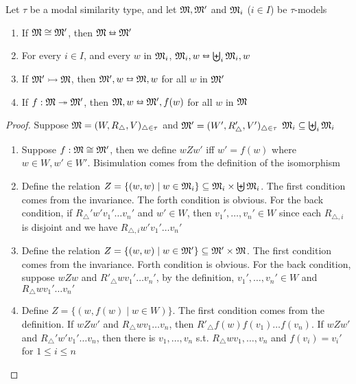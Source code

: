 \documentclass[11pt]{article}
\begin{document}
\begin{proposition}[]
Let \(\tau\) be a modal similarity type, and let \(\mathfrak{M},\mathfrak{M}'\) and \(\mathfrak{M}_i\) (\(i\in
   I\)) be \(\tau\)-models
\begin{enumerate}
\item If \(\mathfrak{M}\cong\mathfrak{M}'\), then \(\mathfrak{M}\leftrightarroweq\mathfrak{M}'\)
\item For every \(i\in I\), and every \(w\) in \(\mathfrak{M}_i\),
\(\mathfrak{M}_i,w\leftrightarroweq\biguplus_i\mathfrak{M}_i,w\)
\item If \(\mathfrak{M}'\rightarrowtail\mathfrak{M}\), then \(\mathfrak{M}',w\leftrightarroweq\mathfrak{M},w\) for
all \(w\) in \(\mathfrak{M}'\)
\item If \(f:\mathfrak{M}\twoheadrightarrow\mathfrak{M}'\), then
\(\mathfrak{M},w\leftrightarroweq\mathfrak{M}',f(w)\) for all \(w\) in \(\mathfrak{M}\)
\end{enumerate}
\end{proposition}

\begin{proof}
Suppose \(\mathfrak{M}=(W,R_{\triangle},V)_{\triangle\in\tau}\) and
\(\mathfrak{M}'=(W',R_{\triangle}',V')_{\triangle\in\tau}\) 
\(\mathfrak{M}_i\subseteq \biguplus_i\mathfrak{M}_i\)
\begin{enumerate}
\item Suppose \(f:\mathfrak{M}\cong\mathfrak{M}'\), then we define \(wZw'\) iff \(w'=f(w)\) where
\(w\in W,w'\in W'\). Bisimulation comes from the definition of the isomorphism
\item Define the relation \(Z=\{(w,w)\mid
      w\in\mathfrak{M}_i\}\subseteq\mathfrak{M}_i\times\biguplus\mathfrak{M}_i\). The first condition comes
from the invariance. The forth condition is obvious. For the back
condition, if \(R_{\triangle}'w'v_1'\dots v_n'\) and \(w'\in W\), then
\(v_1',\dots,v_n'\in W\) since each \(R_{\triangle,i}\) is disjoint and we
have \(R_{\triangle,i}w'v_1'\dots v_n'\)
\item Define the relation \(Z=\{(w,w)\mid w\in\mathfrak{M}'\}\subseteq\mathfrak{M}'\times\mathfrak{M}\).
The first condition comes from the invariance. Forth condition is obvious.
For the back condition, suppose \(wZw\) and \(R'_{\triangle}wv_1'\dots
      v_n'\), by the definition, \(v_1',\dots,v_n'\in W\) and
\(R_{\triangle}wv_1'\dots v_n'\)
\item Define \(Z=\{(w,f(w)\mid w\in W)\}\). The first condition comes from the
definition. If \(wZw'\) and \(R_{\triangle}wv_1\dots v_n\), then
\(R'_{\triangle}f(w)f(v_1)\dots f(v_n)\). If \(wZw'\) and
\(R_{\triangle}'w'v_1'\dots v_n\), then there is \(v_1,\dots,v_n\) s.t.
\(R_{\triangle}wv_1,\dots,v_n\) and \(f(v_i)=v_i'\) for \(1\le i\le n\)
\end{enumerate}
\end{proof}
\end{document}
